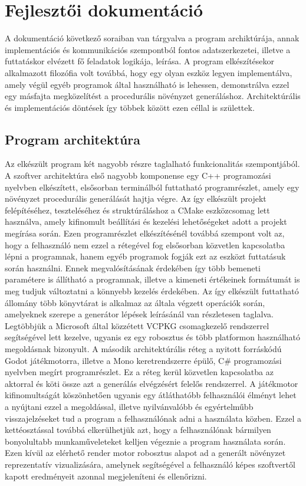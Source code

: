 \chapter{Fejlesztői dokumentáció}
\label{ch:impl}

A dokumentáció következő soraiban van tárgyalva a program archiktúrája, annak implementációs és kommunikációs szempontból fontos adatszerkezetei, illetve a futtatáskor elvézett fő feladatok logikája, leírása. A program elkészítésekor alkalmazott filozófia volt továbbá, hogy egy olyan eszköz legyen implementálva, amely végül egyéb programok által használható is lehessen, demonstrálva ezzel egy másfajta megközelítést a procedurális növényzet generáláshoz. Architektúrális és implementációs döntések így többek között ezen céllal is születtek.

\section{Program architektúra}
Az elkészült program két nagyobb részre taglalható funkcionalitás szempontjából. 
A szoftver architektúra első nagyobb komponense egy C++ programozási nyelvben elkészített, elsősorban terminálból futtatható programrészlet, amely egy növényzet procedurális generálását hajtja végre. Az így elkészült projekt felépítéséhez, teszteléséhez és struktúráláshoz a CMake eszközcsomag lett használva, amely kifinomult beállítási és kezelési lehetőségeket adott  a projekt megírása során. Ezen programrészlet elkészítésénél továbbá szempont volt az, hogy a felhasználó nem ezzel a rétegével fog elsősorban közvetlen kapcsolatba lépni a programnak, hanem egyéb programok fogják ezt az eszközt futtatásuk során használni. Ennek megvalósításának érdekében így több bemeneti paramétere is állítható a programnak, illetve a kimeneti értékeinek formátumát is meg tudjuk változtatni a könnyebb kezelés érdekében. Az így elkészült futtatható állomány több könyvtárat is alkalmaz az általa végzett operációk során, amelyeknek szerepe a generátor lépések leírásánál van részletesen taglalva. Legtöbbjük a Microsoft által közzétett  VCPKG csomagkezelő rendszerrel segítségével lett kezelve, ugyanis ez egy robosztus és több platformon használható megoldásnak bizonyult. \newline
A második architektúrális réteg a nyitott forráskódú Godot játékmotorra, illetve a Mono keretrendszerre épülő, C\# programozási nyelvben megírt programrészlet. Ez a réteg kerül közvetlen kapcsolatba az aktorral és köti össze azt a generálás elvégzésért felelős rendszerrel. A játékmotor kifinomultságát köszönhetően ugyanis egy átláthatóbb felhasználói élményt lehet a nyújtani ezzel a megoldással, illetve nyilvánvalóbb és egyértelműbb visszajelzéseket tud a program a felhasználónak adni a használata közben. Ezzel a kettéosztással továbbá elkerülhetjük azt, hogy a felhasználónak bármilyen bonyolultabb munkaműveleteket kelljen végeznie a program használata során. Ezen kívül az elérhető render motor robosztus alapot ad a generált növényzet reprezentatív vizualizására, amelynek segítségével a felhasználó képes szoftvertől kapott eredményeit azonnal megjeleníteni és ellenőrizni.\newline

